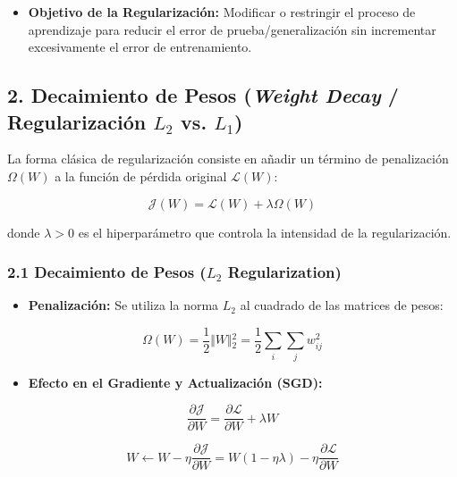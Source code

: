 \documentclass[11pt,oneside]{article}
\begin{document}
\begin{itemize}

\item \textbf{Objetivo de la Regularización:} Modificar o restringir el proceso de aprendizaje para reducir el error de prueba/generalización sin incrementar excesivamente el error de entrenamiento.

\end{itemize}

\subsection{2. Decaimiento de Pesos (\emph{Weight Decay} / Regularización \(L_2\) vs. \(L_1\))}

La forma clásica de regularización consiste en añadir un término de penalización \(\Omega(W)\) a la función de pérdida original \(\mathcal{L}(W)\):

\[\mathcal{J}(W) = \mathcal{L}(W) + \lambda \Omega(W)\]

donde \(\lambda > 0\) es el hiperparámetro que controla la intensidad de la regularización.

\subsubsection{2.1 Decaimiento de Pesos (\(L_2\) Regularization)}

\begin{itemize}

\item \textbf{Penalización:} Se utiliza la norma \(L_2\) al cuadrado de las matrices de pesos:

\end{itemize}

\[\Omega(W) = \frac{1}{2} \Vert{}W\Vert{}_2^2 = \frac{1}{2} \sum_{i} \sum_{j} w_{ij}^2\]

\begin{itemize}

\item \textbf{Efecto en el Gradiente y Actualización (SGD):}

\end{itemize}

\[\frac{\partial \mathcal{J}}{\partial W} = \frac{\partial \mathcal{L}}{\partial W} + \lambda W\]

\[W \leftarrow W - \eta \frac{\partial \mathcal{J}}{\partial W} = W(1 - \eta \lambda) - \eta \frac{\partial \mathcal{L}}{\partial W}\]
\end{document}
